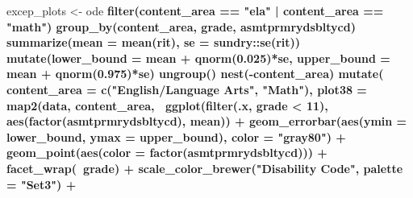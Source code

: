 \documentclass[]{article}
\newenvironment{Shaded}{\begin{snugshade}}{\end{snugshade}}
\newcommand{\DataTypeTok}[1]{\textcolor[rgb]{0.13,0.29,0.53}{#1}}
\newcommand{\DecValTok}[1]{\textcolor[rgb]{0.00,0.00,0.81}{#1}}
\newcommand{\FloatTok}[1]{\textcolor[rgb]{0.00,0.00,0.81}{#1}}
\newcommand{\KeywordTok}[1]{\textcolor[rgb]{0.13,0.29,0.53}{\textbf{#1}}}
\newcommand{\NormalTok}[1]{#1}
\newcommand{\OperatorTok}[1]{\textcolor[rgb]{0.81,0.36,0.00}{\textbf{#1}}}
\newcommand{\StringTok}[1]{\textcolor[rgb]{0.31,0.60,0.02}{#1}}
\begin{document}
\begin{Shaded}
\begin{Highlighting}[]
\NormalTok{excep_plots <-}\StringTok{ }\NormalTok{ode }\OperatorTok{%
\StringTok{  }\KeywordTok{filter}\NormalTok{(content_area }\OperatorTok{==}\StringTok{ "ela"} \OperatorTok{|}
\StringTok{         }\NormalTok{content_area }\OperatorTok{==}\StringTok{ "math"}\NormalTok{) }\OperatorTok{%
\StringTok{  }\KeywordTok{group_by}\NormalTok{(content_area, grade, asmtprmrydsbltycd) }\OperatorTok{%
\StringTok{  }\KeywordTok{summarize}\NormalTok{(}\DataTypeTok{mean =} \KeywordTok{mean}\NormalTok{(rit),}
            \DataTypeTok{se   =}\NormalTok{ sundry}\OperatorTok{::}\KeywordTok{se}\NormalTok{(rit)) }\OperatorTok{%
\StringTok{  }\KeywordTok{mutate}\NormalTok{(}\DataTypeTok{lower_bound =}\NormalTok{ mean }\OperatorTok{+}\StringTok{ }\KeywordTok{qnorm}\NormalTok{(}\FloatTok{0.025}\NormalTok{)}\OperatorTok{*}\NormalTok{se,}
         \DataTypeTok{upper_bound =}\NormalTok{ mean }\OperatorTok{+}\StringTok{ }\KeywordTok{qnorm}\NormalTok{(}\FloatTok{0.975}\NormalTok{)}\OperatorTok{*}\NormalTok{se) }\OperatorTok{%
\StringTok{  }\KeywordTok{ungroup}\NormalTok{() }\OperatorTok{%
\StringTok{  }\KeywordTok{nest}\NormalTok{(}\OperatorTok{-}\NormalTok{content_area) }\OperatorTok{%
\StringTok{  }\KeywordTok{mutate}\NormalTok{(}
    \DataTypeTok{content_area =} \KeywordTok{c}\NormalTok{(}\StringTok{"English/Language Arts"}\NormalTok{, }\StringTok{"Math"}\NormalTok{),}
    \DataTypeTok{plot38 =} \KeywordTok{map2}\NormalTok{(data, content_area,}
      \OperatorTok{~}\KeywordTok{ggplot}\NormalTok{(}\KeywordTok{filter}\NormalTok{(.x, grade }\OperatorTok{<}\StringTok{ }\DecValTok{11}\NormalTok{), }\KeywordTok{aes}\NormalTok{(}\KeywordTok{factor}\NormalTok{(asmtprmrydsbltycd), mean)) }\OperatorTok{+}
\StringTok{        }\KeywordTok{geom_errorbar}\NormalTok{(}\KeywordTok{aes}\NormalTok{(}\DataTypeTok{ymin =}\NormalTok{ lower_bound, }\DataTypeTok{ymax =}\NormalTok{ upper_bound),}
                      \DataTypeTok{color =} \StringTok{"gray80"}\NormalTok{) }\OperatorTok{+}
\StringTok{        }\KeywordTok{geom_point}\NormalTok{(}\KeywordTok{aes}\NormalTok{(}\DataTypeTok{color =} \KeywordTok{factor}\NormalTok{(asmtprmrydsbltycd))) }\OperatorTok{+}
\StringTok{        }\KeywordTok{facet_wrap}\NormalTok{(}\OperatorTok{~}\NormalTok{grade) }\OperatorTok{+}
\StringTok{        }\KeywordTok{scale_color_brewer}\NormalTok{(}\StringTok{"Disability Code"}\NormalTok{, }\DataTypeTok{palette =} \StringTok{"Set3"}\NormalTok{) }\OperatorTok{+}
}}}}}}}
\end{Highlighting}
\end{Shaded}
\end{document}
